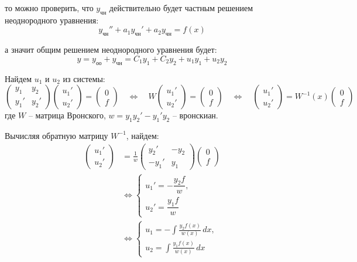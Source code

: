 \documentclass[11pt,a4paper]{article}
\newcommand{\yoo}{y_{\text{оо}}}
\newcommand{\ych}{y_{\text{чн}}}
\begin{document}
то можно проверить, что $\ych$ действительно будет частным решением неоднородного уравнения:
\[
  \ych'' + a_1 \ych' + a_2 \ych = f(x)
\]

а значит общим решением неоднородного уравнения будет:
\[
  y = \yoo + \ych = C_1 y_1 + C_2 y_2 + u_1y_1 + u_2y_2
\] 

Найдем $u_1$ и $u_2$ из системы:
\[
  \begin{pmatrix} y_1 & y_2 \\ y_1' & y_2' \end{pmatrix}
  \begin{pmatrix} u_1' \\ u_2' \end{pmatrix}
  = \begin{pmatrix} 0 \\ f \end{pmatrix}
  \quad\Longleftrightarrow\quad
  W\begin{pmatrix} u_1' \\ u_2' \end{pmatrix}
  = \begin{pmatrix} 0 \\ f \end{pmatrix}
  \quad\Longleftrightarrow\quad
  \begin{pmatrix} u_1' \\ u_2' \end{pmatrix} = W^{-1}(x)\begin{pmatrix} 0 \\ f \end{pmatrix}
\]
где $W$ -- матрица Вронского, $w = y_1y_2' - y_1'y_2$ -- вронскиан.

Вычисляя обратную матрицу $W^{-1}$, найдем:
\[
  \begin{aligned}
    \begin{pmatrix} u_1' \\ u_2' \end{pmatrix}
    &= \frac{1}{w}
       \begin{pmatrix} y_2' & -y_2 \\ -y_1' & y_1 \end{pmatrix}
       \begin{pmatrix} 0 \\ f \end{pmatrix}\\
    &\Longleftrightarrow
      \begin{cases}
        u_1' = -\dfrac{y_2f}{w},\\
        u_2' = \dfrac{y_1f}{w}
      \end{cases}\\
    &\Longleftrightarrow
      \begin{cases}
        u_1 = -\displaystyle\int\frac{y_2f(x)}{w(x)}\,dx,\\
        u_2 = \displaystyle\int\frac{y_1f(x)}{w(x)}\,dx
      \end{cases}
  \end{aligned}
\]
\end{document}
